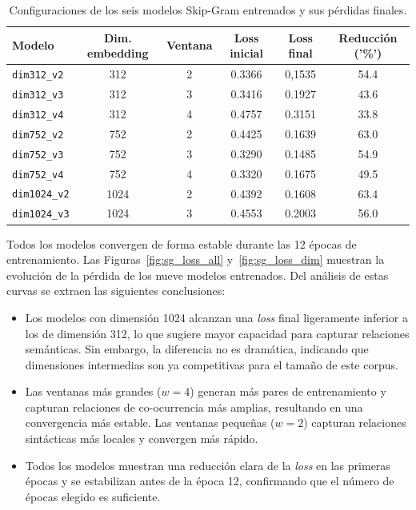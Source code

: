 \documentclass{article}
\begin{document}
\begin{table}[H]
  \centering
  \caption{Configuraciones de los seis modelos Skip-Gram entrenados y sus pérdidas finales.}
  \begin{tabular}{lccccc}
    \toprule
    Modelo & Dim. embedding & Ventana & Loss inicial & Loss final & Reducción ('\%')\\
    \midrule
    \texttt{dim312\_v2}  & 312  & 2 & 0.3366 & 0,1535 & 54.4 \\
    \texttt{dim312\_v3}  & 312  & 3 & 0.3416 & 0.1927 & 43.6 \\
    \texttt{dim312\_v4}  & 312  & 4 & 0.4757 & 0.3151 & 33.8 \\
    \texttt{dim752\_v2}  & 752  & 2 & 0.4425 & 0.1639 & 63.0 \\
    \texttt{dim752\_v3}  & 752  & 3 & 0.3290 & 0.1485 & 54.9 \\
    \texttt{dim752\_v4}  & 752  & 4 & 0.3320 & 0.1675 & 49.5 \\
    \texttt{dim1024\_v2} & 1024 & 2 & 0.4392 & 0.1608 & 63.4\\
    \texttt{dim1024\_v3} & 1024 & 3 & 0.4553 & 0.2003 & 56.0\\
    \bottomrule
  \end{tabular}
\end{table}

Todos los modelos convergen de forma estable durante las 12 épocas de entrenamiento.
Las Figuras~\ref{fig:sg_loss_all} y~\ref{fig:sg_loss_dim} muestran la evolución de la
pérdida de los nueve modelos entrenados. Del análisis de estas curvas se extraen las
siguientes conclusiones:

\begin{itemize}
  \item Los modelos con dimensión 1024 alcanzan una \textit{loss} final ligeramente
        inferior a los de dimensión 312, lo que sugiere mayor capacidad para capturar
        relaciones semánticas. Sin embargo, la diferencia no es dramática, indicando
        que dimensiones intermedias son ya competitivas para el tamaño de este corpus.
  \item Las ventanas más grandes ($w = 4$) generan más pares de entrenamiento y
        capturan relaciones de co-ocurrencia más amplias, resultando en una convergencia
        más estable. Las ventanas pequeñas ($w = 2$) capturan relaciones sintácticas
        más locales y convergen más rápido.
  \item Todos los modelos muestran una reducción clara de la \textit{loss} en las
        primeras épocas y se estabilizan antes de la época 12, confirmando que el
        número de épocas elegido es suficiente.
\end{itemize}
\end{document}
